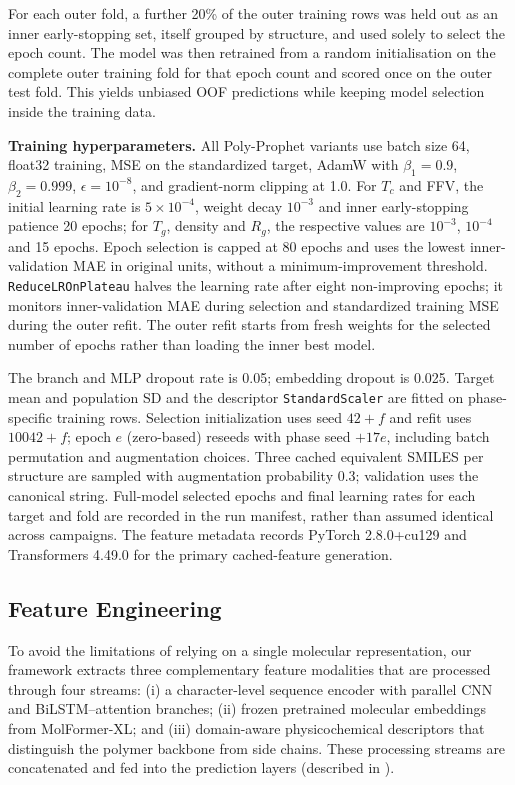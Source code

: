 \documentclass{article}
\begin{document}
For each outer fold, a further 20\% of the outer training rows was held out as an inner early-stopping set, itself grouped by structure, and used solely to select the epoch count. The model was then retrained from a random initialisation on the complete outer training fold for that epoch count and scored once on the outer test fold. This yields unbiased OOF predictions while keeping model selection inside the training data.

\textbf{Training hyperparameters.} All Poly-Prophet variants use batch size 64, float32 training, MSE on the standardized target, AdamW with $\beta_1=0.9$, $\beta_2=0.999$, $\epsilon=10^{-8}$, and gradient-norm clipping at 1.0. For $T_c$ and FFV, the initial learning rate is $5\times10^{-4}$, weight decay $10^{-3}$ and inner early-stopping patience 20 epochs; for $T_g$, density and $R_g$, the respective values are $10^{-3}$, $10^{-4}$ and 15 epochs. Epoch selection is capped at 80 epochs and uses the lowest inner-validation MAE in original units, without a minimum-improvement threshold. \texttt{ReduceLROnPlateau} halves the learning rate after eight non-improving epochs; it monitors inner-validation MAE during selection and standardized training MSE during the outer refit. The outer refit starts from fresh weights for the selected number of epochs rather than loading the inner best model.

The branch and MLP dropout rate is 0.05; embedding dropout is 0.025. Target mean and population SD and the descriptor \texttt{StandardScaler} are fitted on phase-specific training rows. Selection initialization uses seed $42+f$ and refit uses $10042+f$; epoch $e$ (zero-based) reseeds with phase seed $+17e$, including batch permutation and augmentation choices. Three cached equivalent SMILES per structure are sampled with augmentation probability 0.3; validation uses the canonical string. Full-model selected epochs and final learning rates for each target and fold are recorded in the run manifest, rather than assumed identical across campaigns. The feature metadata records PyTorch 2.8.0+cu129 and Transformers 4.49.0 for the primary cached-feature generation.

\subsection{Feature Engineering}

To avoid the limitations of relying on a single molecular representation, our framework extracts three complementary feature modalities that are processed through four streams: (i) a character-level sequence encoder with parallel CNN and BiLSTM--attention branches; (ii) frozen pretrained molecular embeddings from MolFormer-XL; and (iii) domain-aware physicochemical descriptors that distinguish the polymer backbone from side chains. These processing streams are concatenated and fed into the prediction layers (described in ).
\end{document}
